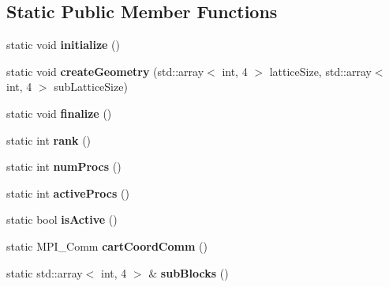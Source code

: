 \subsection*{Static Public Member Functions}
\begin{DoxyCompactItemize}
\item 
static void {\bfseries initialize} ()\hypertarget{classParallel_a7cf27d593972dee2d3f6e5319fcf450e}{}\label{classParallel_a7cf27d593972dee2d3f6e5319fcf450e}

\item 
static void {\bfseries create\+Geometry} (std\+::array$<$ int, 4 $>$ lattice\+Size, std\+::array$<$ int, 4 $>$ sub\+Lattice\+Size)\hypertarget{classParallel_a8888fe404de3a3f479fff0796916f851}{}\label{classParallel_a8888fe404de3a3f479fff0796916f851}

\item 
static void {\bfseries finalize} ()\hypertarget{classParallel_ac81d8fad81830939d9338b2e46d71b60}{}\label{classParallel_ac81d8fad81830939d9338b2e46d71b60}

\item 
static int {\bfseries rank} ()\hypertarget{classParallel_ad8a436ba61d28a6f7569eec3ac4a929e}{}\label{classParallel_ad8a436ba61d28a6f7569eec3ac4a929e}

\item 
static int {\bfseries num\+Procs} ()\hypertarget{classParallel_a6af0b709a019dd91b0d3bbd4a2b74e54}{}\label{classParallel_a6af0b709a019dd91b0d3bbd4a2b74e54}

\item 
static int {\bfseries active\+Procs} ()\hypertarget{classParallel_a9569b920d302407a51a43c125a878b43}{}\label{classParallel_a9569b920d302407a51a43c125a878b43}

\item 
static bool {\bfseries is\+Active} ()\hypertarget{classParallel_a1402031c4027212fa9cd53cbe86b5b41}{}\label{classParallel_a1402031c4027212fa9cd53cbe86b5b41}

\item 
static M\+P\+I\+\_\+\+Comm {\bfseries cart\+Coord\+Comm} ()\hypertarget{classParallel_a127b363a07b22186627f532b2ab04c28}{}\label{classParallel_a127b363a07b22186627f532b2ab04c28}

\item 
static std\+::array$<$ int, 4 $>$ \& {\bfseries sub\+Blocks} ()\hypertarget{classParallel_ad237dc02b7a88cfc454b5a87573588ea}{}\label{classParallel_ad237dc02b7a88cfc454b5a87573588ea}


\end{DoxyCompactItemize}
